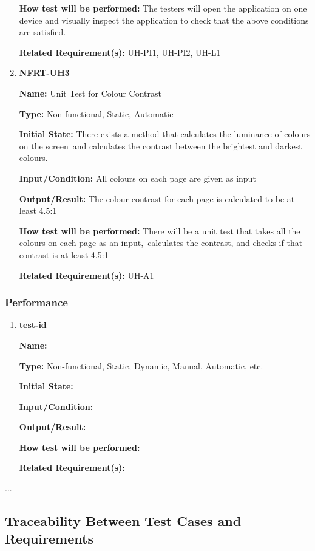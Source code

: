 \documentclass[12pt, titlepage]{article}
\begin{document}
\begin{enumerate}
\textbf{How test will be performed:} The testers will open the application on one device and visually inspect the application to check that the above conditions are satisfied.

\textbf{Related Requirement(s):} UH-PI1, UH-PI2, UH-L1

\item{\textbf{NFRT-UH3}}

\textbf{Name:} Unit Test for Colour Contrast

\textbf{Type:} Non-functional, Static, Automatic
					
\textbf{Initial State:} There exists a method that calculates the luminance of colours on the screen\
and calculates the contrast between the brightest and darkest colours.

\textbf{Input/Condition:} All colours on each page are given as input

\textbf{Output/Result:} The colour contrast for each page is calculated to be at least 4.5:1

\textbf{How test will be performed:} There will be a unit test that takes all the colours on each page as an input,\
calculates the contrast, and checks if that contrast is at least 4.5:1

\textbf{Related Requirement(s):} UH-A1

\end{enumerate}

\subsubsection{Performance}

\begin{enumerate}
\item{\textbf{test-id}}

\textbf{Name:}
  
\textbf{Type:} Non-functional, Static, Dynamic, Manual, Automatic, etc.
            
\textbf{Initial State:}
  
\textbf{Input/Condition:}
            
\textbf{Output/Result:}
  
\textbf{How test will be performed:}
  
\textbf{Related Requirement(s):}
  
\end{enumerate}

...

\subsection{Traceability Between Test Cases and Requirements}
\end{document}
